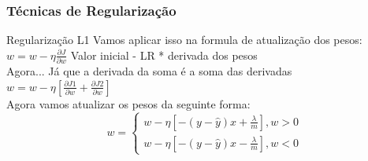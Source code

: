 \documentclass{beamer}
\begin{document}
\begin{frame}
	\frametitle{Técnicas de Regularização}
	\begin{block}{Regularização L1}
		Vamos aplicar isso na formula de atualização dos pesos:
		$w = w - \eta \frac{\partial J}{\partial w}$ Valor inicial - LR * derivada dos pesos \\
		Agora... Já que a derivada da soma é a soma das derivadas \\
		$w = w - \eta [\frac{\partial J1}{\partial w} + \frac{\partial J2}{\partial w}]$ \\
		Agora vamos atualizar os pesos da seguinte forma:
		$$w =  \left\{\begin{matrix}
			w - \eta [-(y-\hat{y})x + \frac{\lambda}{m}], w > 0
			\\ 
			w - \eta [-(y-\hat{y})x - \frac{\lambda}{m}], w < 0
		\end{matrix}\right.$$
	\end{block}
\end{frame}
\end{document}
